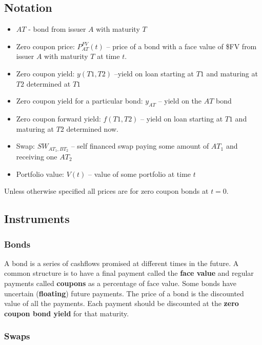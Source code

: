 \subsection{Notation}

\begin{itemize}
\item $AT$ - bond from issuer $A$ with maturity $T$
\item Zero coupon price: $P_{AT}^{FV}(t)$  -- price of a bond with a face value of \$FV from issuer $A$ with maturity $T$ at time $t$.
\item Zero coupon yield: $y(T1,T2)$  --yield on loan starting at $T1$ and maturing at $T2$ determined at $T1$
\item Zero coupon yield for a particular bond: $y_{AT}$ -- yield on the $AT$ bond
\item Zero coupon forward yield: $f(T1,T2)$ -- yield on loan starting at $T1$ and maturing at $T2$ determined now.
\item Swap: $SW_{AT_1,BT_2}$ -- self financed swap paying some amount of $AT_1$ and receiving one $AT_2$
\item Portfolio value: $V(t)$ -- value of some portfolio at time $t$
\end{itemize}

Unless otherwise specified all prices are for zero coupon bonds at $t=0$.

\subsection{Instruments}

\subsubsection{Bonds}

 A bond is a series of cashflows promised at different times in the future. A common structure is to have a final payment called the \textbf{face value} and regular payments called \textbf{coupons} as a percentage of face value. Some bonds have uncertain (\textbf{floating}) future payments. The price of a bond is the discounted value of all the payments.  Each payment should be discounted at the \textbf{zero coupon bond yield} for that maturity.

\subsubsection{Swaps}

